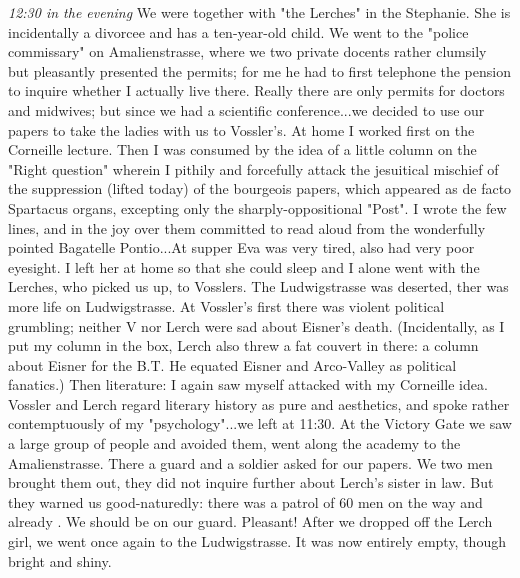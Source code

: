 \textit{12:30 in the evening} We were together with "the Lerches" in the Stephanie. She is incidentally a divorcee and has a ten-year-old child. We went to the "police commissary" on Amalienstrasse, where we two private docents rather clumsily but pleasantly presented the permits; for me he had to first telephone the pension to inquire whether I actually live there. Really there are only permits for doctors and midwives; but since we had a scientific conference...we decided to use our papers to take the ladies with us to Vossler's. At home I worked first on the Corneille lecture. Then I was consumed by the idea of a little column on the "Right question" wherein I pithily and forcefully attack the jesuitical mischief of the suppression (lifted today) of the bourgeois papers, which appeared as de facto Spartacus organs, excepting only the sharply-oppositional "Post". I wrote the few lines, and in the joy over them committed to read aloud from the wonderfully pointed Bagatelle Pontio...At supper Eva was very tired, also had very poor eyesight. I left her at home so that she could sleep and I alone went with the Lerches, who picked us up, to Vosslers. The Ludwigstrasse was deserted, ther was more life on Ludwigstrasse. At Vossler's first there was violent political grumbling; neither V nor Lerch were sad about Eisner's death. (Incidentally, as I put my column in the box, Lerch also threw a fat couvert in there: a column about Eisner for the B.T. He equated Eisner and Arco-Valley as political fanatics.) Then literature: I again saw myself attacked with my Corneille idea. Vossler and Lerch regard literary history as pure  and aesthetics, and spoke rather contemptuously of my "psychology"...we left at 11:30. At the Victory Gate we saw a large group of people and avoided them, went along the academy to the Amalienstrasse. There a guard and a soldier asked for our papers. We two men brought them out, they did not inquire further about Lerch's sister in law. But they warned us good-naturedly: there was a patrol of 60 men on the way and already . We should be on our guard. Pleasant! After we dropped off the Lerch girl, we went once again to the Ludwigstrasse. It was now entirely empty, though bright and shiny.